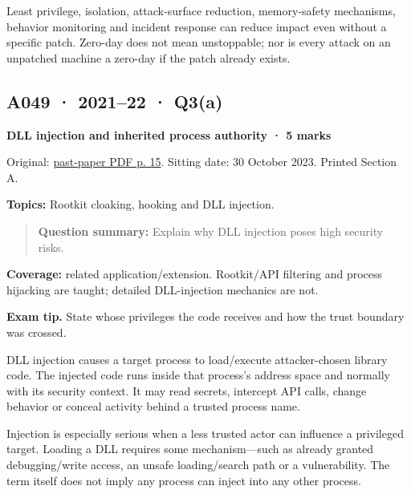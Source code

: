 \documentclass[11pt,a4paper]{article}
\begin{document}
Least privilege,\allowbreak{} isolation,\allowbreak{} attack-surface reduction,\allowbreak{} memory-safety mechanisms,\allowbreak{} behavior monitoring and incident response can reduce impact even without a specific patch. Zero-day does not mean unstoppable; nor is every attack on an unpatched machine a zero-day if the patch already exists.




\clearpage
\subsection{A049 · 2021–22 · Q3(a)}\label{a049}

\textbf{DLL injection and inherited process authority · 5 marks}


Original: \href{../../CSE405-Security_Merged.pdf\#page=15}{past-paper PDF p. 15}. Sitting date: 30 October 2023. Printed Section A.


\textbf{Topics:} Rootkit cloaking,\allowbreak{} hooking and DLL injection.



\begin{quote}\small

\textbf{Question summary:} Explain why DLL injection poses high security risks.



\end{quote}

\textbf{Coverage:} related application/\allowbreak{}extension. Rootkit/\allowbreak{}API filtering and process hijacking are taught; detailed DLL-injection mechanics are not.



{\color{ForestGreen}\textbf{Exam tip.} State whose privileges the code receives and how the trust boundary was crossed.}


DLL injection causes a target process to load/\allowbreak{}execute attacker-chosen library code. The injected code runs inside that process's address space and normally with its security context. It may read secrets,\allowbreak{} intercept API calls,\allowbreak{} change behavior or conceal activity behind a trusted process name.


Injection is especially serious when a less trusted actor can influence a privileged target. Loading a DLL requires some mechanism—such as already granted debugging/\allowbreak{}write access,\allowbreak{} an unsafe loading/\allowbreak{}search path or a vulnerability. The term itself does not imply any process can inject into any other process.
\end{document}
